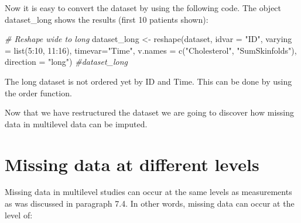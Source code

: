 \documentclass[
]{book}
\newenvironment{Shaded}{\begin{snugshade}}{\end{snugshade}}
\newcommand{\AttributeTok}[1]{\textcolor[rgb]{0.77,0.63,0.00}{#1}}
\newcommand{\CommentTok}[1]{\textcolor[rgb]{0.56,0.35,0.01}{\textit{#1}}}
\newcommand{\DecValTok}[1]{\textcolor[rgb]{0.00,0.00,0.81}{#1}}
\newcommand{\FunctionTok}[1]{\textcolor[rgb]{0.00,0.00,0.00}{#1}}
\newcommand{\NormalTok}[1]{#1}
\newcommand{\OtherTok}[1]{\textcolor[rgb]{0.56,0.35,0.01}{#1}}
\newcommand{\SpecialCharTok}[1]{\textcolor[rgb]{0.00,0.00,0.00}{#1}}
\newcommand{\StringTok}[1]{\textcolor[rgb]{0.31,0.60,0.02}{#1}}
\begin{document}
Now it is easy to convert the dataset by using the following code. The object dataset\_long shows the results (first 10 patients shown):

\begin{Shaded}
\begin{Highlighting}[]
\CommentTok{\# Reshape wide to long}
\NormalTok{dataset\_long }\OtherTok{\textless{}{-}} \FunctionTok{reshape}\NormalTok{(dataset, }\AttributeTok{idvar =} \StringTok{"ID"}\NormalTok{, }\AttributeTok{varying =} \FunctionTok{list}\NormalTok{(}\DecValTok{5}\SpecialCharTok{:}\DecValTok{10}\NormalTok{, }\DecValTok{11}\SpecialCharTok{:}\DecValTok{16}\NormalTok{), }\AttributeTok{timevar=}\StringTok{"Time"}\NormalTok{, }
         \AttributeTok{v.names =} \FunctionTok{c}\NormalTok{(}\StringTok{"Cholesterol"}\NormalTok{, }\StringTok{"SumSkinfolds"}\NormalTok{), }\AttributeTok{direction =} \StringTok{"long"}\NormalTok{)}
\CommentTok{\#dataset\_long}
\end{Highlighting}
\end{Shaded}

The long dataset is not ordered yet by ID and Time. This can be done by using the order function.

\begin{Shaded}
\end{Shaded}

Now that we have restructured the dataset we are going to discover how missing data in multilevel data can be imputed.

\hypertarget{missing-data-at-different-levels}{%
\section{Missing data at different levels}\label{missing-data-at-different-levels}}

Missing data in multilevel studies can occur at the same levels as measurements as was discussed in paragraph 7.4. In other words, missing data can occur at the level of:
\end{document}
